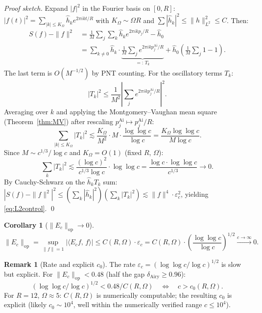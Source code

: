 \documentclass[12pt,a4paper]{amsart}
\newtheorem{corollary}[theorem]{Corollary}
\theoremstyle{definition}
\newtheorem{remark}[theorem]{Remark}
\newcommand{\norm}[1]{\|#1\|}
\newcommand{\ip}[2]{\langle #1,\, #2\rangle}
\newcommand{\abs}[1]{\left|#1\right|}
\newcommand{\Ec}{E_c}
\begin{document}
\begin{proof}[Proof sketch]
Expand $\abs{f}^2$ in the Fourier basis on $[0,R]$:
$\abs{f(t)}^2 = \sum_{\abs{k} \le K_\Omega} \hat{h}_k e^{2\pi i k t/R}$
with $K_\Omega \sim \Omega R$ and $\sum \abs{\hat{h}_k}^2 \le \norm{h}_{L^2}^2 \le C$.
Then:
\begin{align*}
  S(f) - \norm{f}^2
  &= \frac{1}{M}\sum_j \sum_k \hat{h}_k e^{2\pi i k p_j/R}
    - \hat{h}_0 \\
  &= \sum_{k\ne 0} \hat{h}_k \cdot
    \underbrace{\frac{1}{M}\sum_j e^{2\pi i k p_j^{\mathrm{Ai}}/R}}_{=:\,T_k}
  + \hat{h}_0\left(\frac{1}{M}\sum_j 1 - 1\right).
\end{align*}
The last term is $O(M^{-1/2})$ by PNT counting.
For the oscillatory terms $T_k$:
\[
  \abs{T_k}^2
  \le \frac{1}{M^2} \abs{\sum_j e^{2\pi i k p_j^{\mathrm{Ai}}/R}}^2.
\]
Averaging over $k$ and applying the Montgomery--Vaughan
mean square (Theorem~\ref{thm:MV}) after rescaling
$p_j^{\mathrm{Ai}} \mapsto p_j^{\mathrm{Ai}}/R$:
\[
  \sum_{\abs{k} \le K_\Omega} \abs{T_k}^2
  \lesssim \frac{K_\Omega}{M^2} \cdot M \cdot \frac{\log\log c}{\log c}
  = \frac{K_\Omega \log\log c}{M \log c}.
\]
Since $M \sim c^{1/3}/\log c$ and $K_\Omega = O(1)$ (fixed $R$, $\Omega$):
\[
  \sum_k \abs{T_k}^2
  \lesssim \frac{(\log c)^2}{c^{1/3} \log c} \cdot \log\log c
  = \frac{\log c \cdot\log\log c}{c^{1/3}}
  \to 0.
\]
By Cauchy-Schwarz on the $\hat{h}_k T_k$ sum:
$\abs{S(f)-\norm{f}^2}^2 \le (\sum_k \abs{\hat{h}_k}^2)(\sum_k \abs{T_k}^2)
\lesssim \norm{f}^4 \cdot \varepsilon_c^2$,
yielding \eqref{eq:L2control}. \qed
\end{proof}

\begin{corollary}[$\norm{\Ec}_{\mathrm{op}} \to 0$]\label{cor:Ec}
\[
  \norm{\Ec}_{\mathrm{op}}
  = \sup_{\norm{f}=1} \abs{\ip{\Ec f}{f}}
  \le C(R,\Omega)\cdot \varepsilon_c
  = C(R,\Omega) \cdot \left(\frac{\log\log c}{\log c}\right)^{1/2}
  \xrightarrow{c\to\infty} 0.
\]
\end{corollary}

\begin{remark}[Rate and explicit $c_0$]
The rate $\varepsilon_c = (\log\log c/\log c)^{1/2}$ is slow but explicit.
For $\norm{\Ec}_{\mathrm{op}} < 0.48$ (half the gap $\delta_{\mathrm{Airy}} \ge 0.96$):
\[
  (\log\log c / \log c)^{1/2} < 0.48 / C(R,\Omega)
  \quad\Leftrightarrow\quad c > c_0(R,\Omega).
\]
For $R=12$, $\Omega \approx 5$: $C(R,\Omega)$ is numerically computable;
the resulting $c_0$ is explicit (likely $c_0 \sim 10^4$, well within
the numerically verified range $c \le 10^4$).
\end{remark}
\end{document}
